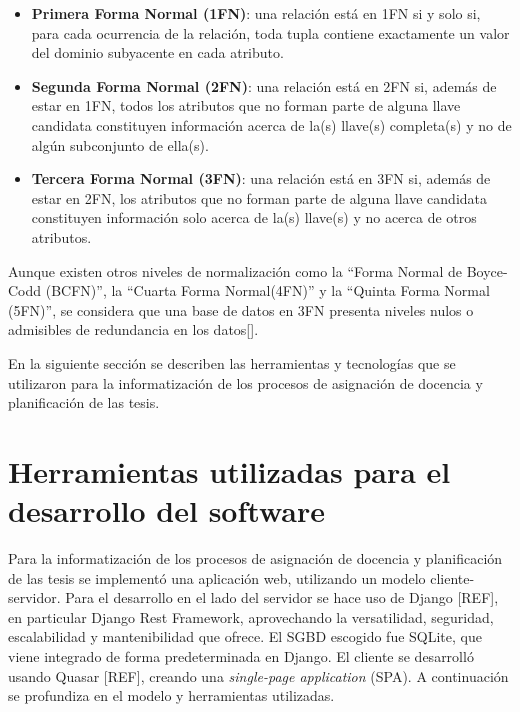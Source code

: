\begin{itemize}
    \item \textbf{Primera Forma Normal (1FN)}: una relación está en 1FN si y solo si, para 
    cada ocurrencia de la relación, toda tupla contiene exactamente un valor del dominio subyacente en
    cada atributo.
    \item \textbf{Segunda Forma Normal (2FN)}: una relación está en 2FN si, además de estar en 
    1FN, todos los atributos que no forman parte de alguna llave candidata constituyen información 
    acerca de la(s) llave(s) completa(s) y no de algún subconjunto de ella(s).
    \item \textbf{Tercera Forma Normal (3FN)}: una relación está en 3FN si, además de estar en 2FN,
    los atributos que no forman parte de alguna llave candidata constituyen información solo acerca
    de la(s) llave(s) y no acerca de otros atributos.
\end{itemize}


Aunque existen otros niveles de normalización como la ``Forma Normal de Boyce-Codd (BCFN)'',
la ``Cuarta Forma Normal(4FN)'' y la ``Quinta Forma Normal (5FN)'',
se considera que una base de datos en 3FN presenta niveles nulos o 
admisibles de redundancia en los datos[\cite{ws_3FN}].







En la siguiente sección se describen las herramientas y tecnologías 
que se utilizaron para la informatización de los procesos de asignación de 
docencia y planificación de las tesis.



\section{Herramientas utilizadas para el desarrollo del software}
Para la informatización de los procesos
de asignación de docencia y planificación de las tesis
se implementó una aplicación web,
utilizando un modelo cliente-servidor.
Para el desarrollo en el lado del servidor se hace uso de Django [REF], en particular Django Rest Framework, aprovechando la
versatilidad, seguridad, escalabilidad y mantenibilidad
que ofrece.
El SGBD escogido fue SQLite, que viene integrado de forma 
predeterminada en Django.
El cliente se desarrolló usando Quasar [REF], creando una
\textit{single-page application} (SPA).
A continuación se profundiza en el modelo 
y herramientas utilizadas.

